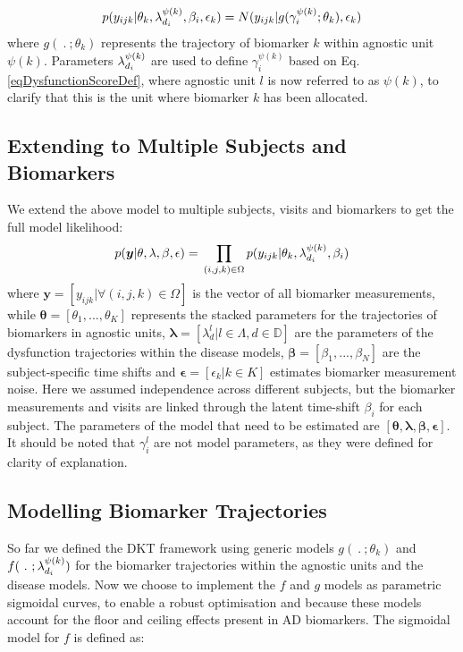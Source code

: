 \documentclass{llncs}
\begin{document}
\begin{equation}
 p(y_{ijk}|\theta_k, \lambda_{d_i}^{\psi(k)}, \beta_i, \epsilon_k) = N(y_{ijk}| g( \gamma_i^{\psi(k)} ; \theta_k), \epsilon_k)
\end{equation}
where $g(\ .\ ; \theta_k)$ represents the trajectory of biomarker $k$ within agnostic unit $\psi(k)$. Parameters $\lambda_{d_i}^{\psi(k)}$ are used to define $\gamma_i^{\psi(k)}$ based on Eq. \ref{eqDysfunctionScoreDef}, where agnostic unit $l$ is now referred to as $\psi(k)$, to clarify that this is the unit where biomarker $k$ has been allocated. 

\subsection{Extending to Multiple Subjects and Biomarkers}

We extend the above model to multiple subjects, visits and biomarkers to get the full model likelihood:
\begin{equation}
 p(\boldsymbol{y}|\theta, \lambda, \beta , \epsilon) = \\ \prod_{(i,j,k) \in \Omega} p(y_{ijk}|\theta_k, \lambda_{d_i}^{\psi(k)}, \beta_i) 
\end{equation}
where $\boldsymbol{y} = [y_{ijk} | \forall (i,j,k) \in \Omega ]$ is the vector of all biomarker measurements, while $\boldsymbol{\theta} = [\theta_1, ..., \theta_K]$ represents the stacked parameters for the trajectories of biomarkers in agnostic units, $\boldsymbol{\lambda} = [\lambda_d^{l}|l \in \Lambda, d \in \mathbb{D}]$ are the parameters of the dysfunction trajectories within the disease models, $\boldsymbol{\beta} =[\beta_1, ..., \beta_N]$ are the subject-specific time shifts and $\boldsymbol{\epsilon} = [\epsilon_k | k \in K]$  estimates biomarker measurement noise. Here we assumed independence across different subjects, but the biomarker measurements and visits are linked through the latent time-shift $\beta_i$ for each subject. The parameters of the model that need to be estimated are $[\boldsymbol{\theta}, \boldsymbol{\lambda}, \boldsymbol{\beta}, \boldsymbol{\epsilon}]$. It should be noted that $\gamma_i^l$ are not model parameters, as they were defined for clarity of explanation.

\subsection{Modelling Biomarker Trajectories}
\label{sec:dktBiomkTraj}

So far we defined the DKT framework using generic models $g(\ .\ ; \theta_k)$ and $f(\ .\ ; \lambda_{d_i}^{\psi(k)})$ for the biomarker trajectories within the agnostic units and the disease models. Now we choose to implement the $f$ and $g$ models as parametric sigmoidal curves, to enable a robust optimisation and because these models account for the floor and ceiling effects present in AD biomarkers. The sigmoidal model for $f$ is defined as:
\end{document}
